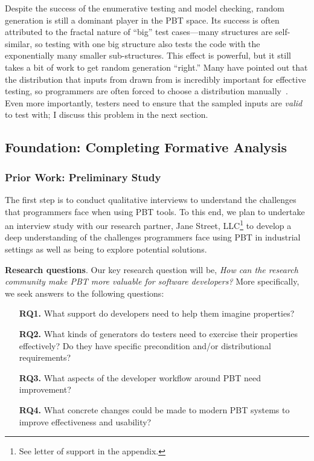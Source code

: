 Despite the success of the enumerative testing and model checking, random
generation is still a dominant player in the PBT space. Its success is often
attributed to the fractal nature of ``big'' test cases---many structures are
self-similar, so testing with one big structure also tests the code with the
exponentially many smaller sub-structures. This effect is powerful, but it still
takes a bit of work to get random generation ``right.'' Many have pointed out
that the distribution that inputs from drawn from is incredibly important for
effective testing, so programmers are often forced to choose a distribution
manually~\cite{DBLP:conf/icfp/ClaessenH00}. Even more importantly, testers need
to ensure that the sampled inputs are {\em valid} to test with; I discuss this
problem in the next section.


%
%

\subsection{Foundation: Completing Formative Analysis }
\subsubsection{Prior Work: Preliminary Study}

The first step is to conduct qualitative interviews to understand the challenges
that programmers face when using PBT tools. To this end, we plan to undertake an
interview study with our research partner, Jane Street, LLC\footnote{See letter
of support in the appendix.} to develop a deep understanding of the challenges
programmers face using PBT in industrial settings as well as being to explore
potential solutions.

\textbf{Research questions}.
Our key research question will be, \emph{How can the research community make PBT
more valuable for software developers?} More specifically, we seek
answers to the following questions:

\begin{itemize}[noitemsep,leftmargin=4em]
\item[\bf RQ1.] What support do developers need to help them imagine properties? 
\item[\bf RQ2.] What kinds of generators do testers need to exercise their
  properties effectively? Do they have specific precondition and/or distributional
  requirements?
\item[\bf RQ3.] What aspects of the developer workflow around PBT need improvement?
\item[\bf RQ4.] What concrete changes could be made to modern PBT systems
  to improve effectiveness and usability?
\end{itemize}

